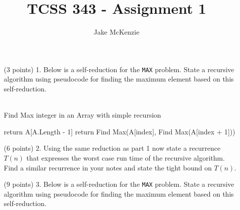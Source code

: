 \documentclass[12pt]{article}
\begin{document}
\title{TCSS 343 - Assignment 1}
\author{Jake McKenzie}
\maketitle
\begin{enumerate}
\item [(3 points) 1.] Below is a self-reduction for the \texttt{MAX} problem. State a recursive algorithm using pseudocode for finding the maximum element based on this self-reduction.\\\\
\begin{algorithm}
\caption{Find Max integer in an Array with simple recursion}
\label{array-sum}
\begin{algorithmic}[1]
        \State return A[A.Length - 1]
    \EndIf
    \State return Find Max(A[index], Find Max(A[index + 1]))
\EndProcedure
\end{algorithmic}
\end{algorithm}
\item [(6 points) 2.] Using the same reduction as part 1 now state a recurrence $T(n)$ that expresses the worst case run time of the recursive algorithm. Find a similar recurrence in your notes and state the tight bound on $T(n)$.
\item [(9 points) 3.] Below is a self-reduction for the \texttt{MAX} problem. State a recursive algorithm using pseudocode for finding the maximum element based on this self-reduction.
\end{enumerate}
\end{document}
